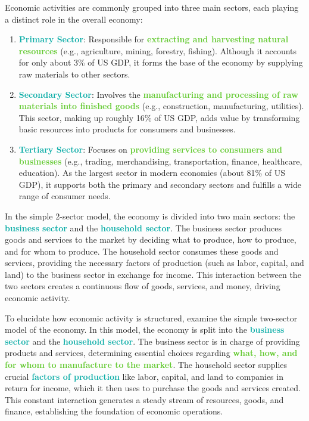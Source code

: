 \documentclass[twoside]{article}
\newcommand{\highlightbluetext}[1]{\textcolor[HTML]{09ACA6}{\textbf{#1}}}
\newcommand{\highlightgreentext}[1]{\textcolor[HTML]{62C92F}{\textbf{#1}}}
\numberwithin{equation}{section}
\begin{document}
	Economic activities are commonly grouped into three main sectors, each playing a distinct role in the overall economy:
	\begin{enumerate}
		\item \highlightbluetext{Primary Sector}: Responsible for \highlightgreentext{extracting and harvesting natural resources} (e.g., agriculture, mining, forestry, fishing). Although it accounts for only about 3\% of US GDP, it forms the base of the economy by supplying raw materials to other sectors.
		\item \highlightbluetext{Secondary Sector}: Involves the \highlightgreentext{manufacturing and processing of raw materials into finished goods} (e.g., construction, manufacturing, utilities). This sector, making up roughly 16\% of US GDP, adds value by transforming basic resources into products for consumers and businesses.
		\item \highlightbluetext{Tertiary Sector}: Focuses on \highlightgreentext{providing services to consumers and businesses} (e.g., trading, merchandising, transportation, finance, healthcare, education). As the largest sector in modern economies (about 81\% of US GDP), it supports both the primary and secondary sectors and fulfills a wide range of consumer needs.
	\end{enumerate}

	In the simple 2-sector model, the economy is divided into two main sectors: the \highlightbluetext{business sector} and the \highlightbluetext{household sector}. The business sector produces goods and services to the market by deciding what to produce, how to produce, and for whom to produce. The household sector consumes these goods and services, providing the necessary factors of production (such as labor, capital, and land) to the business sector in exchange for income. This interaction between the two sectors creates a continuous flow of goods, services, and money, driving economic activity.

    To elucidate how economic activity is structured, examine the simple two-sector model of the economy. In this model, the economy is split into the \highlightbluetext{business sector} and the \highlightbluetext{household sector}. The business sector is in charge of providing products and services, determining essential choices regarding \highlightgreentext{what, how, and for whom to manufacture to the market}. The household sector supplies crucial \highlightbluetext{factors of production} like labor, capital, and land to companies in return for income, which it then uses to purchase the goods and services created. This constant interaction generates a steady stream of resources, goods, and finance, establishing the foundation of economic operations.
\end{document}
